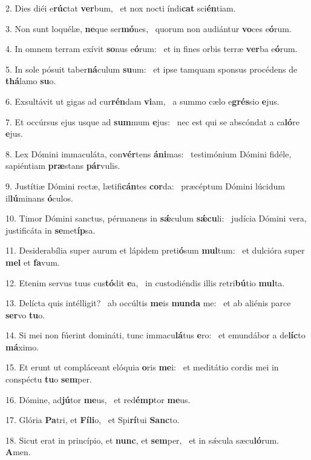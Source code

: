 2. Dies diéi e\textbf{rúc}tat \textbf{ver}bum, \ast\  et nox nocti índi\textbf{cat} sci\textbf{én}tiam.\

3. Non sunt loquélæ, \textbf{ne}que ser\textbf{mó}nes, \ast\  quorum non audiántur \textbf{vo}ces e\textbf{ó}rum.\

4. In omnem terram exívit \textbf{so}nus e\textbf{ó}rum: \ast\  et in fines orbis terræ \textbf{ver}ba e\textbf{ó}rum.\

5. In sole pósuit taber\textbf{ná}culum \textbf{su}um: \ast\  et ipse tamquam sponsus procédens de \textbf{thá}lamo \textbf{su}o.\

6. Exsultávit ut gigas ad cur\textbf{rén}dam \textbf{vi}am, \ast\  a summo cælo e\textbf{grés}sio \textbf{e}jus.\

7. Et occúrsus ejus usque ad \textbf{sum}mum \textbf{e}jus: \ast\  nec est qui se abscóndat a ca\textbf{ló}re \textbf{e}jus.\

8. Lex Dómini immaculáta, con\textbf{vér}tens \textbf{á}\textbf{ni}mas: \ast\  testimónium Dómini fidéle, sapiéntiam \textbf{præ}stans \textbf{pár}vulis.\

9. Justítiæ Dómini rectæ, lætifi\textbf{cán}tes \textbf{cor}da: \ast\  præcéptum Dómini lúcidum il\textbf{lú}minans \textbf{ó}culos.\

10. Timor Dómini sanctus, pérmanens in \textbf{sǽ}culum \textbf{sǽ}\textbf{cu}li: \ast\  judícia Dómini vera, justificáta in \textbf{se}met\textbf{íp}sa.\

11. Desiderabília super aurum et lápidem preti\textbf{ó}sum \textbf{mul}tum: \ast\  et dulcióra super \textbf{mel} et \textbf{fa}vum.\

12. Etenim servus tuus cus\textbf{tó}dit \textbf{e}a, \ast\  in custodiéndis illis retri\textbf{bú}tio \textbf{mul}ta.\

13. Delícta quis intélligit? \dag\  ab occúltis \textbf{me}is \textbf{mun}\textbf{da} me: \ast\  et ab aliénis parce \textbf{ser}vo \textbf{tu}o.\

14. Si mei non fúerint domináti, tunc immacu\textbf{lá}tus \textbf{e}ro: \ast\  et emundábor a de\textbf{líc}to \textbf{má}ximo.\

15. Et erunt ut compláceant elóquia \textbf{o}ris \textbf{me}i: \ast\  et meditátio cordis mei in conspéctu \textbf{tu}o \textbf{sem}per.\

16. Dómine, ad\textbf{jú}tor \textbf{me}us, \ast\  et red\textbf{émp}tor \textbf{me}us.\

17. Glória \textbf{Pa}tri, et \textbf{Fí}\textbf{li}o, \ast\  et Spi\textbf{rí}tui \textbf{Sanc}to.\

18. Sicut erat in princípio, et \textbf{nunc}, et \textbf{sem}per, \ast\  et in sǽcula sæcu\textbf{ló}rum. \textbf{A}men.\

